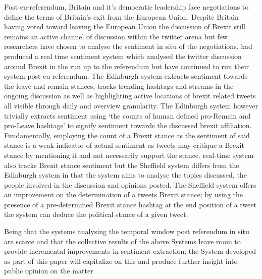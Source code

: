 \documentclass[11pt]{report}
\begin{document}
Post eu-referendum, Britain and it's democratic leadership face negotiations to define the terms of Britain's exit from the European Union. Despite Britain having voted toward leaving the European Union the discussion of Brexit still remains an active channel of discussion within the twitter arena but few researchers have chosen to analyse the sentiment in situ of the negotiations. \cite{llewellyn_brexit?_2016} had produced a real time sentiment system which analysed the twitter discussion around Brexit in the run up to the referendum but have continued to run their system post eu-referendum. The Edinburgh system extracts sentiment towards the leave and remain stances, tracks trending hashtags and streams in the ongoing discussion as well as highlighting active locations of brexit related tweets all visible through daily and overview granularity. The Edinburgh system however trivially extracts sentiment using `the counts of human defined pro-Remain and pro-Leave hashtags' to signify sentiment towards the discussed brexit affiliation. Fundamentally, employing the count of a Brexit stance as the sentiment of said stance is a weak indicator of actual sentiment as tweets may critique a Brexit stance by mentioning it and not necessarily support the stance. \cite{maynard_framework_2017} real-time system also tracks Brexit stance sentiment but the Sheffield system differs from the Edinburgh system in that the system aims to analyse the topics discussed, the people involved in the discussion and opinions posted. The Sheffield system offers an improvement on the determination of a tweets Brexit stance; by using the presence of a pre-determined Brexit stance hashtag at the end position of a tweet the system can deduce the political stance of a given tweet. 
\\
\enlargethispage{\baselineskip}
\enlargethispage{\baselineskip}
\vspace{-0.20cm}

Being that the systems analysing the temporal window post referendum in situ are scarce and that the collective results of the above Systems leave room to provide incremental improvements in sentiment extraction; the System developed as part of this paper will capitalize on this and produce further insight into public opinion on the matter.
\end{document}
